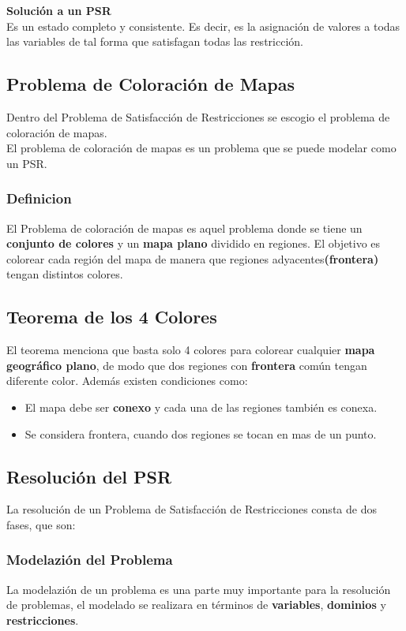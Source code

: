 \documentclass[a4paper]{article}
\begin{document}
\textbf{Solución a un PSR}\\
Es un estado completo y consistente. Es decir, es la asignación de valores a todas las variables de tal forma que satisfagan todas las restricción.

\subsection{Problema de Coloración de Mapas}
Dentro del Problema de Satisfacción de Restricciones se escogio el problema de coloración de mapas.\\
El problema de coloración de mapas es un problema que se puede modelar como un PSR.
\subsubsection*{Definicion}
El Problema de coloración de mapas es aquel problema donde se tiene un \textbf{conjunto de colores} y un \textbf{mapa plano} dividido en regiones. El objetivo es colorear cada región del mapa de manera que regiones adyacentes\textbf{(frontera)} tengan distintos colores.

\subsection{Teorema de los 4 Colores}
El teorema menciona que basta solo 4 colores para colorear cualquier \textbf{mapa geográfico plano}, de modo que dos regiones con \textbf{frontera} común tengan diferente color. Además existen condiciones como:
\begin{itemize}
\item El mapa debe ser \textbf{conexo} y cada una de las regiones también es conexa.
\item Se considera frontera, cuando dos regiones se tocan en mas de un punto.
\end{itemize}

\subsection{Resolución del PSR}
La resolución de un Problema de Satisfacción de Restricciones consta de dos fases, que son:

\subsubsection{Modelazión del Problema}
La modelazión de un problema es una parte muy importante para la resolución de problemas, el modelado se realizara en términos de \textbf{variables}, \textbf{dominios} y \textbf{restricciones}.
\end{document}

